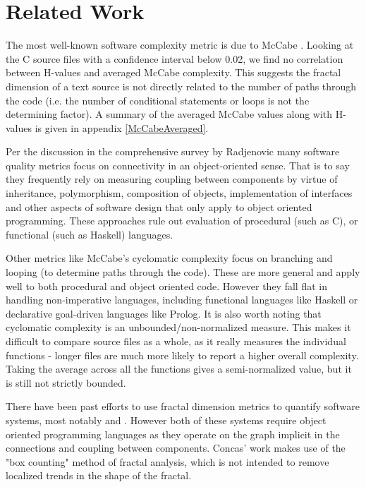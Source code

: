 \documentclass[12pt]{article}
\begin{document}
\section{Related Work}\label{RelatedWork}

The most well-known software complexity metric is due to McCabe \cite{McCabe:SoftwareComplexity:76}.
Looking at the C source files with a confidence interval below 0.02, we find no correlation between H-values and averaged McCabe complexity.  This suggests the fractal dimension of a text source is not directly related to the number of paths through the code (i.e. the number of conditional statements or loops is not the determining factor).  A summary of the averaged McCabe values along with H-values is given in appendix \ref{McCabeAveraged}.


Per the discussion in the comprehensive survey \cite{Radjenovic:SoftwareMetrics:13} by Radjenovic many software quality metrics focus on connectivity in an object-oriented sense.  That is to say they frequently rely on measuring coupling between components by virtue of inheritance, polymorphism, composition of objects, implementation of interfaces and other aspects of software design that only apply to object oriented programming.  These approaches rule out evaluation of procedural (such as C), or functional (such as Haskell) languages. 


Other metrics like McCabe's cyclomatic complexity focus on branching and looping (to determine paths through the code).  These are more general and apply well to both procedural and object oriented code.  However they fall flat in handling non-imperative languages, including functional languages like Haskell or declarative goal-driven languages like Prolog.   It is also worth noting that cyclomatic complexity is an unbounded/non-normalized measure.  This makes it difficult to compare source files as a whole, as it really measures the individual functions - longer files are much more likely to report a higher overall complexity.  Taking the average across all the functions gives a semi-normalized value, but it is still not strictly bounded.


There have been past efforts to use fractal dimension metrics to quantify software systems, most notably \cite{Concas:FractalSoftware:06} and \cite{Valverde:SmallWorlds:03}.  However both of these systems require object oriented programming languages as they operate on the graph implicit in the connections and coupling between components.  Concas' work makes use of the "box counting" method of fractal analysis, which is not intended to remove localized trends in the shape of the fractal.
\end{document}
